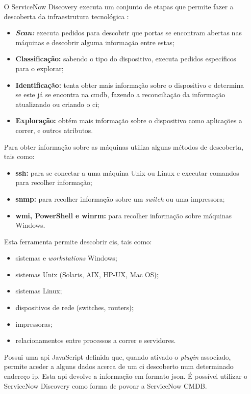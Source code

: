 \documentclass[
  oneside,
  11pt, a4paper,
  footinclude=true,
  headinclude=true,
  cleardoublepage=empty
]{scrbook}
\begin{document}
O ServiceNow Discovery executa um conjunto de etapas que permite fazer a descoberta da infraestrutura tecnológica \cite{owen2019operation}:
\begin{itemize}
    \item \textbf{\textit{Scan:}} executa pedidos para descobrir que portas se encontram abertas nas máquinas e descobrir alguma informação entre estas;
    \item \textbf{Classificação:} sabendo o tipo do dispositivo, executa pedidos específicos para o explorar;
    \item \textbf{Identificação:} tenta obter mais informação sobre o dispositivo e determina se este já se encontra na \gls{cmdb}, fazendo a reconciliação da informação atualizando ou criando o \gls{ci};
    \item \textbf{Exploração:} obtém mais informação sobre o dispositivo como aplicações a correr, e outros atributos.
\end{itemize}

Para obter informação sobre as máquinas utiliza alguns métodos de descoberta, tais como:
\begin{itemize}
    \item \textbf{\gls{ssh}:} para se conectar a uma máquina Unix ou Linux e executar comandos para recolher informação;
    \item \textbf{\gls{snmp}:} para recolher informação sobre um \textit{switch} ou uma impressora;
    \item \textbf{\gls{wmi}, PowerShell e \gls{winrm}:} para recolher informação sobre máquinas Windows.
\end{itemize}

Esta ferramenta permite descobrir \glspl{ci}, tais como:
\begin{itemize}
    \item sistemas e \textit{workstations} Windows;
    \item sistemas Unix (Solaris, AIX, HP-UX, Mac OS);
    \item sistemas Linux;
    \item dispositivos de rede (switches, routers);
    \item impressoras;
    \item relacionamentos entre processos a correr e servidores.
\end{itemize}

Possui uma \gls{api} JavaScript definida que, quando ativado o \textit{plugin} associado, permite aceder a alguns dados acerca de um \gls{ci} descoberto num determinado endereço \gls{ip}. Esta \gls{api} devolve a informação em formato \gls{json}. É possível utilizar o ServiceNow Discovery como forma de povoar a ServiceNow CMDB.
\end{document}
